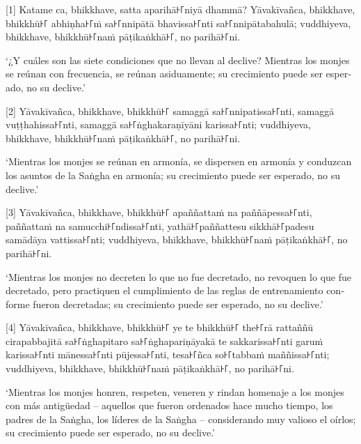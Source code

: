 [1] Katame ca, bhikkhave, satta aparihā꜔꜒niyā dhammā? Yāvakīvañca, bhikkhave, bhikkhū꜔꜒
abhiṇha꜔꜒ṁ sa꜔꜒nnipātā bhavissa꜔꜒nti sa꜔꜒nnipātabahulā; vuddhiyeva, bhikkhave,
bhikkhū꜔꜒naṁ pāṭikaṅkhā꜔꜒, no parihā꜔꜒ni.

\begin{english}
  `¿Y cuáles son las siete condiciones que no llevan al declive? Mientras los monjes
  se reúnan con frecuencia, se reúnan asiduamente; su crecimiento puede ser esperado, no su declive.'

\end{english}

[2] Yāvakīvañca, bhikkhave, bhikkhū꜔꜒ samaggā sa꜔꜒nnipatissa꜔꜒nti, samaggā
vuṭṭhahissa꜔꜒nti, samaggā sa꜔꜒ṅghakaraṇīyāni karissa꜔꜒nti; vuddhiyeva, bhikkhave,
bhikkhū꜔꜒naṁ pāṭikaṅkhā꜔꜒, no parihā꜔꜒ni.

\begin{english}
  `Mientras los monjes se reúnan en armonía, se dispersen en armonía y conduzcan los asuntos de la Saṅgha en armonía; su crecimiento puede ser
  esperado, no su declive.'
\end{english}

[3] Yāvakīvañca, bhikkhave, bhikkhū꜔꜒ apaññattaṁ na paññāpessa꜔꜒nti, paññattaṁ na
samucchi꜔꜒ndissa꜔꜒nti, yathā꜔꜒paññattesu sikkhā꜔꜒padesu samādāya vattissa꜔꜒nti;
vuddhiyeva, bhikkhave, bhikkhū꜔꜒naṁ pāṭikaṅkhā꜔꜒, no parihā꜔꜒ni.

\begin{english}
  `Mientras los monjes no decreten lo que no fue decretado, no revoquen lo que
  fue decretado, pero practiquen el cumplimiento de las reglas de entrenamiento conforme
  fueron decretadas; su crecimiento puede ser
  esperado, no su declive.'
\end{english}

[4] Yāvakīvañca, bhikkhave, bhikkhū꜔꜒ ye te bhikkhū꜔꜒ the꜔꜒rā rattaññū cirapabbajitā
sa꜔꜒ṅghapitaro sa꜔꜒ṅghapariṇāyakā te sakkarissa꜔꜒nti garuṁ karissa꜔꜒nti mānessa꜔꜒nti
pūjessa꜔꜒nti, tesa꜔꜒ñca so꜔꜒tabbaṁ maññissa꜔꜒nti; vuddhiyeva, bhikkhave, bhikkhū꜔꜒naṁ
pāṭikaṅkhā꜔꜒, no parihā꜔꜒ni.

\begin{english}
  `Mientras los monjes honren, respeten, veneren y rindan homenaje a los
  monjes con más antigüedad  -- aquellos que fueron ordenados hace mucho tiempo, los padres de la Saṅgha, los líderes de la Saṅgha -- considerando muy valioso el oírlos; su crecimiento puede ser
  esperado, no su declive.'
\end{english}

